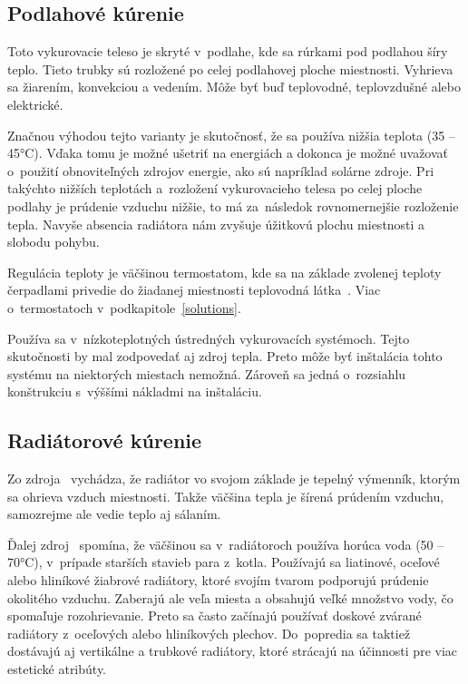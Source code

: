 \subsection*{Podlahové kúrenie}
Toto vykurovacie teleso je skryté v~podlahe, kde sa rúrkami pod podlahou šíry teplo. 
Tieto trubky sú rozložené po celej podlahovej ploche miestnosti. Vyhrieva sa žiarením, konvekciou a vedením. 
Môže byť buď teplovodné, teplovzdušné alebo elektrické.~\cite{tuffin_2018}

Značnou výhodou tejto varianty je skutočnosť, že sa používa nižšia teplota (35 – 45°C). 
Vďaka tomu je možné ušetriť na energiách a dokonca je možné uvažovať o~použití obnoviteľných zdrojov energie, ako sú napríklad solárne zdroje. 
Pri takýchto nižších teplotách a~rozložení vykurovacieho telesa po celej ploche podlahy je prúdenie vzduchu nižšie, to má za~následok rovnomernejšie rozloženie tepla. 
Navyše absencia radiátora nám zvyšuje úžitkovú plochu miestnosti a slobodu pohybu.~\cite{olesen2002radiant}

Regulácia teploty je väčšinou termostatom, kde sa na základe zvolenej teploty čerpadlami privedie do žiadanej miestnosti teplovodná látka~\cite{olesen2002radiant}. 
Viac o~termostatoch v~podkapitole~\ref{solutions}.

Používa sa v~nízkoteplotných ústredných vykurovacích systémoch. 
Tejto skutočnosti by mal zodpovedať aj zdroj tepla. 
Preto môže byť inštalácia tohto systému na niektorých miestach nemožná. 
Zároveň sa jedná o~rozsiahlu konštrukciu s~výššími nákladmi na inštaláciu.



\subsection*{Radiátorové kúrenie}
Zo zdroja~\cite{radiator_2014} vychádza, že radiátor vo svojom základe je tepelný výmenník, ktorým sa ohrieva vzduch miestnosti. 
Takže väčšina tepla je šírená prúdením vzduchu, samozrejme ale vedie teplo aj sálaním.

Ďalej zdroj~\cite{radiator_2014} spomína, že väčšinou sa v~radiátoroch používa horúca voda (50 – 70°C), v~prípade starších stavieb para z~kotla. 
Používajú sa liatinové, oceľové alebo hliníkové žiabrové radiátory, ktoré svojím tvarom podporujú prúdenie okolitého vzduchu. 
Zaberajú ale veľa miesta a obsahujú veľké množstvo vody, čo spomaľuje rozohrievanie. 
Preto sa často začínajú používať doskové zvárané radiátory z~oceľových alebo hliníkových plechov. 
Do~popredia sa taktiež dostávajú aj vertikálne a trubkové radiátory, ktoré strácajú na účinnosti pre viac estetické atribúty.

